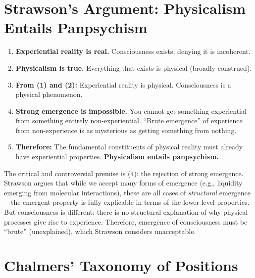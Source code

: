\documentclass[11pt,a4paper]{report}
\begin{document}
\section{Strawson's Argument: Physicalism Entails Panpsychism}

\begin{argbox}
\begin{enumerate}[leftmargin=1.5em]
  \item \textbf{Experiential reality is real.} Consciousness exists; denying it is incoherent.
  \item \textbf{Physicalism is true.} Everything that exists is physical (broadly construed).
  \item \textbf{From (1) and (2):} Experiential reality is physical. Consciousness is a physical phenomenon.
  \item \textbf{Strong emergence is impossible.} You cannot get something experiential from something entirely non-experiential. ``Brute emergence'' of experience from non-experience is as mysterious as getting something from nothing.
  \item \textbf{Therefore:} The fundamental constituents of physical reality must already have experiential properties. \textbf{Physicalism entails panpsychism.}
\end{enumerate}
\end{argbox}

The critical and controversial premise is (4): the rejection of strong emergence. Strawson argues that while we accept many forms of emergence (e.g., liquidity emerging from molecular interactions), these are all cases of \emph{structural} emergence---the emergent property is fully explicable in terms of the lower-level properties. But consciousness is different: there is no structural explanation of why physical processes give rise to experience. Therefore, emergence of consciousness must be ``brute'' (unexplained), which Strawson considers unacceptable.

\section{Chalmers' Taxonomy of Positions}
\end{document}
